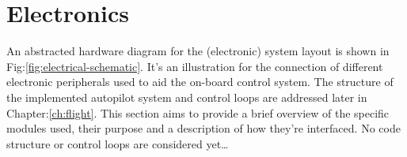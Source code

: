 \section{Electronics}
\label{sec:proto.layout}
{\centering
{}
\label{fig:electrical-schematic}
}
\newpage
An abstracted hardware diagram for the (electronic) system layout is shown in Fig:\ref{fig:electrical-schematic}. It's an illustration for the connection of different electronic peripherals used to aid the on-board control system. The structure of the implemented autopilot system and control loops are addressed later in Chapter:\ref{ch:flight}. This section aims to provide a brief overview of the specific modules used, their purpose and a description of how they're interfaced. No code structure or control loops are considered yet\ldots
